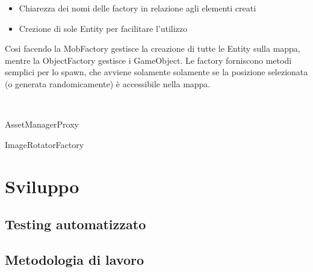\documentclass[a4paper,12pt]{report}
\begin{document}
    \begin{itemize}
        \item Chiarezza dei nomi delle factory in relazione agli elementi creati
        \item Crezione di sole Entity per facilitare l'utilizzo
    \end{itemize}
    Cosi facendo la MobFactory gestisce la creazione di tutte le Entity sulla mappa, mentre la ObjectFactory gestisce i GameObject.
    Le factory forniscono metodi semplici per lo spawn, che avviene solamente solamente se la posizione selezionata (o generata randomicamente) è accessibile
    nella mappa.
    \\
    \par
    \\
    \par AssetManagerProxy
    \par ImageRotatorFactory

    \chapter{Sviluppo}
    \section{Testing automatizzato}
    \section{Metodologia di lavoro}
\end{document}
